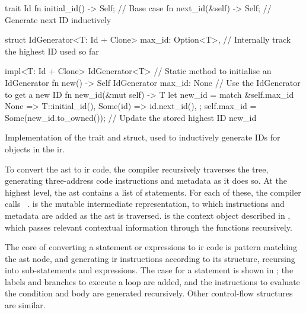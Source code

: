 \documentclass[00-main.tex]{subfiles}
\begin{document}
\begin{listing}[t]
  \begin{RustListing}
    trait Id {
        fn initial_id() -> Self;   // Base case
        fn next_id(&self) -> Self; // Generate next ID inductively
    }

    struct IdGenerator<T: Id + Clone> {
        max_id: Option<T>,         // Internally track the highest ID used so far
    }

    impl<T: Id + Clone> IdGenerator<T> {
        // Static method to initialise an IdGenerator
        fn new() -> Self {
            IdGenerator { max_id: None }
        }
        // Use the IdGenerator to get a new ID
        fn new_id(&mut self) -> T {
            let new_id = match &self.max_id {
                None => T::initial_id(),
                Some(id) => id.next_id(),
            };
            self.max_id = Some(new_id.to_owned()); // Update the stored highest ID
            new_id
        }
    }
  \end{RustListing}
  \caption{Implementation of the  trait and  struct, used to inductively generate IDs for objects in the \acrlong{ir}.}
  \label{lst:Id and IdGenerator implementation}
\end{listing}


To convert the \gls{ast} to \gls{ir} code, the compiler recursively traverses the tree, generating three-address code instructions and metadata as it does so.
At the highest level, the \gls{ast} contains a list of statements.
For each of these, the compiler calls ~. %
 is the mutable intermediate representation, to which instructions and metadata are added as the \gls{ast} is traversed.
 is the context object described in , which passes relevant contextual information through the functions recursively.

The core of converting a statement or expressions to \gls{ir} code is pattern matching the \gls{ast} node, and generating \gls{ir} instructions according to its structure, recursing into sub-statements and expressions.
The case for a  statement is shown in ; the labels and branches to execute a  loop are added, and the instructions to evaluate the condition and body are generated recursively.
Other control-flow structures are similar.
\end{document}
